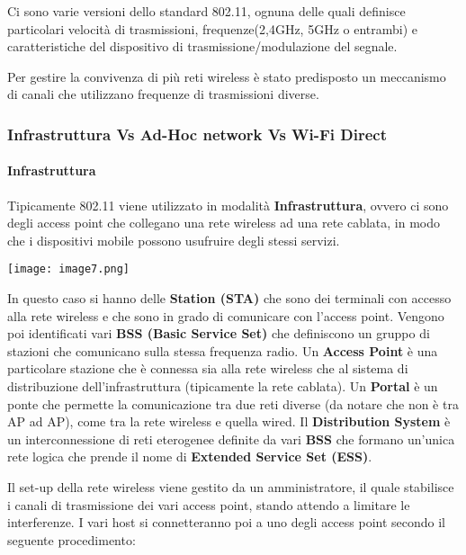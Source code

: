Ci sono varie versioni dello standard 802.11, ognuna delle quali definisce 
particolari velocità di trasmissioni, frequenze(2,4GHz, 5GHz o entrambi) e 
caratteristiche del dispositivo di trasmissione/modulazione del segnale.

Per gestire la convivenza di più reti wireless è stato predisposto un
meccanismo di canali che utilizzano frequenze di trasmissioni diverse.

\subsubsection{Infrastruttura Vs Ad-Hoc network Vs Wi-Fi
Direct}\label{infrastruttura-vs-ad-hoc-network-vs-wi-fi-direct}

\paragraph{Infrastruttura }\label{infrastruttura}

Tipicamente 802.11 viene utilizzato in modalità \textbf{Infrastruttura},
ovvero ci sono degli access point che collegano una rete wireless ad una
rete cablata, in modo che i dispositivi mobile possono usufruire degli
stessi servizi.

\texttt{[image: image7.png]}

In questo caso si hanno delle \textbf{Station (STA)} che sono dei
terminali con accesso alla rete wireless e che sono in grado di
comunicare con l'access point. Vengono poi identificati vari \textbf{BSS
(Basic Service Set)} che definiscono un gruppo di stazioni che
comunicano sulla stessa frequenza radio. Un \textbf{Access Point} è una
particolare stazione che è connessa sia alla rete wireless che al
sistema di distribuzione dell'infrastruttura (tipicamente la rete
cablata). Un \textbf{Portal} è un ponte che permette la comunicazione
tra due reti diverse (da notare che non è tra AP ad AP), come tra la
rete wireless e quella wired. Il \textbf{Distribution System} è un
interconnessione di reti eterogenee definite da vari \textbf{BSS} che
formano un'unica rete logica che prende il nome di \textbf{Extended
Service Set (ESS)}.

Il set-up della rete wireless viene gestito da un amministratore, il
quale stabilisce i canali di trasmissione dei vari access point, stando
attendo a limitare le interferenze. I vari host si connetteranno poi a
uno degli access point secondo il seguente procedimento:


